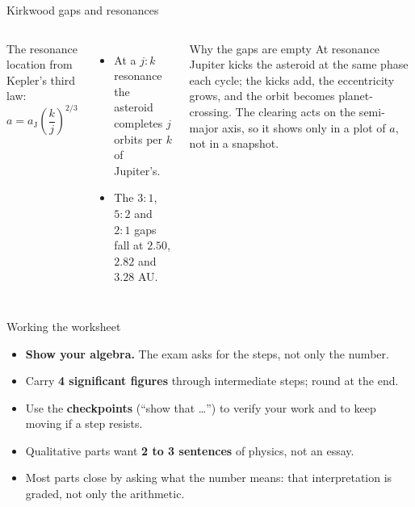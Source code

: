 \documentclass[aspectratio=169, 11pt]{beamer}
\begin{document}
\begin{frame}{Kirkwood gaps and resonances}
  \small
  \begin{columns}[T]
    The resonance location from Kepler's third law:
    \[
      \boxed{a = a_\mathrm{J}\left(\frac{k}{j}\right)^{2/3}}
    \]
    \begin{itemize}
      \item At a $j\!:\!k$ resonance the asteroid completes $j$ orbits per $k$ of Jupiter's.
      \item The $3\!:\!1$, $5\!:\!2$ and $2\!:\!1$ gaps fall at $2.50$, $2.82$ and $3.28$ AU.
    \end{itemize}

    \begin{block}{Why the gaps are empty}
      At resonance Jupiter kicks the asteroid at the same phase each cycle; the kicks add, the eccentricity grows, and the orbit becomes planet-crossing. The clearing acts on the semi-major axis, so it shows only in a plot of $a$, not in a snapshot.
    \end{block}
  \end{columns}
\end{frame}

\begin{frame}{Working the worksheet}
  \begin{itemize}
    \item \textbf{Show your algebra.} The exam asks for the steps, not only the number.
    \item Carry \textbf{4 significant figures} through intermediate steps; round at the end.
    \item Use the \textbf{checkpoints} (``show that \ldots'') to verify your work and to keep moving if a step resists.
    \item Qualitative parts want \textbf{2 to 3 sentences} of physics, not an essay.
    \item Most parts close by asking what the number means: that interpretation is graded, not only the arithmetic.
  \end{itemize}
  \vskip8pt\relax
\end{frame}
\end{document}
